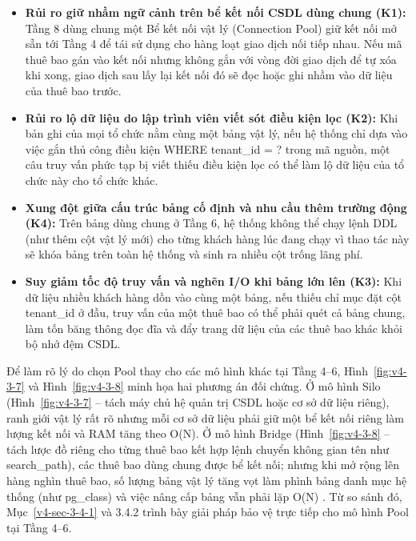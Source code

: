 \begin{itemize}
\item
  \textbf{Rủi ro giữ nhầm ngữ cảnh trên bể kết nối CSDL dùng chung (K1):} Tầng 8 dùng chung một Bể kết nối vật lý (Connection Pool) giữ kết nối mở sẵn tới Tầng 4 để tái sử dụng cho hàng loạt giao dịch nối tiếp nhau. Nếu mã thuê bao gán vào kết nối nhưng không gắn với vòng đời giao dịch để tự xóa khi xong, giao dịch sau lấy lại kết nối đó sẽ đọc hoặc ghi nhầm vào dữ liệu của thuê bao trước.
\item
  \textbf{Rủi ro lộ dữ liệu do lập trình viên viết sót điều kiện lọc (K2):} Khi bản ghi của mọi tổ chức nằm cùng một bảng vật lý, nếu hệ thống chỉ dựa vào việc gắn thủ công điều kiện WHERE tenant\_\allowbreak{}id = ? trong mã nguồn, một câu truy vấn phức tạp bị viết thiếu điều kiện lọc có thể làm lộ dữ liệu của tổ chức này cho tổ chức khác.
\item
  \textbf{Xung đột giữa cấu trúc bảng cố định và nhu cầu thêm trường động (K4):} Trên bảng dùng chung ở Tầng 6, hệ thống không thể chạy lệnh DDL (như thêm cột vật lý mới) cho từng khách hàng lúc đang chạy vì thao tác này sẽ khóa bảng trên toàn hệ thống và sinh ra nhiều cột trống lãng phí.
\item
  \textbf{Suy giảm tốc độ truy vấn và nghẽn I/O khi bảng lớn lên (K3):} Khi dữ liệu nhiều khách hàng dồn vào cùng một bảng, nếu thiếu chỉ mục đặt cột tenant\_\allowbreak{}id ở đầu, truy vấn của một thuê bao có thể phải quét cả bảng chung, làm tốn băng thông đọc đĩa và đẩy trang dữ liệu của các thuê bao khác khỏi bộ nhớ đệm CSDL.
\end{itemize}

Để làm rõ lý do chọn Pool thay cho các mô hình khác tại Tầng 4--6, Hình~\ref{fig:v4-3-7} và Hình~\ref{fig:v4-3-8} minh họa hai phương án đối chứng. Ở mô hình Silo (Hình~\ref{fig:v4-3-7} -- tách máy chủ hệ quản trị CSDL hoặc cơ sở dữ liệu riêng), ranh giới vật lý rất rõ nhưng mỗi cơ sở dữ liệu phải giữ một bể kết nối riêng làm lượng kết nối và RAM tăng theo O(N). Ở mô hình Bridge (Hình~\ref{fig:v4-3-8} -- tách lược đồ riêng cho từng thuê bao kết hợp lệnh chuyển không gian tên như search\_\allowbreak{}path), các thuê bao dùng chung được bể kết nối; nhưng khi mở rộng lên hàng nghìn thuê bao, số lượng bảng vật lý tăng vọt làm phình bảng danh mục hệ thống (như pg\_\allowbreak{}class) và việc nâng cấp bảng vẫn phải lặp O(N) \cite{v4-21}. Từ so sánh đó, Mục~\ref{v4-sec-3-4-1} và 3.4.2 trình bày giải pháp bảo vệ trực tiếp cho mô hình Pool tại Tầng 4--6.


